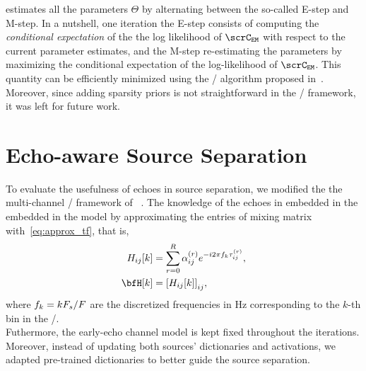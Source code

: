  estimates all the parameters $\Theta$ by alternating between the so-called E-step and M-step.
In a nutshell, one iteration the E-step consists of computing the \textit{conditional expectation} of the the log likelihood of $\scrC_{\mathtt{EM}}$ with respect to the current parameter estimates,
and the M-step re-estimating the parameters by maximizing the conditional expectation of the log-likelihood of $\scrC_{\mathtt{EM}}$.
This quantity can be efficiently minimized using the \EM/ algorithm proposed in~.
Moreover, since adding sparsity priors is not straightforward in the \EM/ framework, it was left for future work.


\section{Echo-aware Source Separation}
To evaluate the usefulness of echoes in source separation, we modified the the multi-channel \NMF/ framework of \citeauthor{ozerov2010multichannel}~.
The knowledge of the echoes in embedded in the embedded in the model by approximating the entries of mixing matrix with~\eqref{eq:approx_tf}, that is,
\begin{equation}
    \begin{aligned}
        \FLT_{\idxMicSrc}[k] &= \sum_{\idxEch=0}^{\numEchs} \alpha_{\idxMicSrc}^{(\idxEch)} \cste^{-\csti 2 \pi f_k \tau_{\idxMicSrc}^{(\idxEch)}},\\
        \FLTSS[k] &= \kbracket{\FLT_{\idxMicSrc}[k]}_{\idxMicSrc},
    \end{aligned}
\end{equation}
where $f_k = kF_s/F$ are the discretized frequencies in Hz corresponding to the $k$-th bin in the \DFT/.
\\Futhermore, the early-echo channel model is kept fixed throughout the iterations.
Moreover, instead of updating both sources' dictionaries and activations, we adapted pre-trained dictionaries to better guide the source separation.

